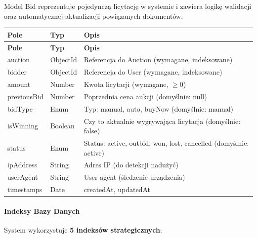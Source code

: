 Model Bid reprezentuje pojedynczą licytację w systemie i zawiera logikę walidacji oraz automatycznej aktualizacji powiązanych dokumentów.

\begin{longtable}{|p{3.5cm}|p{2.5cm}|p{8cm}|}
  \hline
  \textbf{Pole} & \textbf{Typ} & \textbf{Opis}                                                    \\ \hline
  \endfirsthead
  \hline
  \textbf{Pole} & \textbf{Typ} & \textbf{Opis}                                                    \\ \hline
  \endhead

  auction       & ObjectId     & Referencja do Auction (wymagane, indeksowane)                    \\ \hline
  bidder        & ObjectId     & Referencja do User (wymagane, indeksowane)                       \\ \hline
  amount        & Number       & Kwota licytacji (wymagane, $\geq 0$)                             \\ \hline
  previousBid   & Number       & Poprzednia cena aukcji (domyślnie: null)                         \\ \hline
  bidType       & Enum         & Typ: manual, auto, buyNow (domyślnie: manual)                    \\ \hline
  isWinning     & Boolean      & Czy to aktualnie wygrywająca licytacja (domyślnie: false)        \\ \hline
  status        & Enum         & Status: active, outbid, won, lost, cancelled (domyślnie: active) \\ \hline
  ipAddress     & String       & Adres IP (do detekcji nadużyć)                                   \\ \hline
  userAgent     & String       & User agent (śledzenie urządzenia)                                \\ \hline
  timestamps    & Date         & createdAt, updatedAt                                             \\ \hline
\end{longtable}

\paragraph{Indeksy Bazy Danych}

System wykorzystuje \textbf{5 indeksów strategicznych}:

